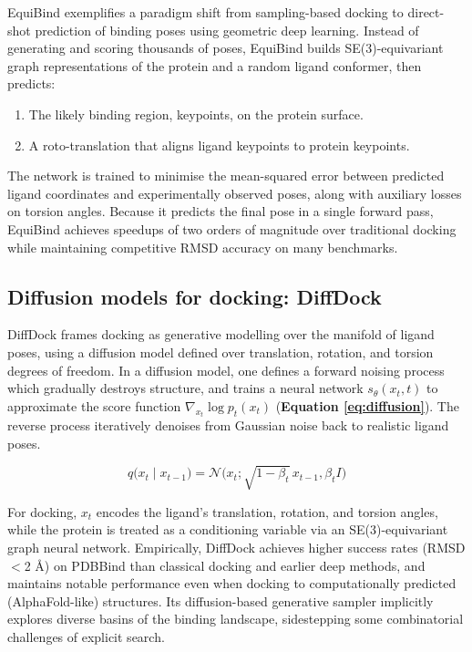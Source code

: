 \documentclass[12pt]{article}
\begin{document}
EquiBind\cite{CH13_stark2022equibind} exemplifies a paradigm shift from sampling-based docking to direct-shot prediction of binding poses using geometric deep learning. Instead of generating and scoring thousands of poses, EquiBind builds SE(3)-equivariant graph representations of the protein and a random ligand conformer, then predicts:
\begin{enumerate}
  \item The likely binding region, keypoints, on the protein surface.
  \item A roto-translation that aligns ligand keypoints to protein keypoints.
\end{enumerate}
The network is trained to minimise the mean-squared error between predicted ligand coordinates and experimentally observed poses, along with auxiliary losses on torsion angles\cite{CH13_stark2022equibind,CH13_equibindnews2023}. Because it predicts the final pose in a single forward pass, EquiBind achieves speedups of two orders of magnitude over traditional docking while maintaining competitive RMSD accuracy on many benchmarks.

\subsection{Diffusion models for docking: DiffDock}

DiffDock\cite{CH13_corso2022diffdock} frames docking as generative modelling over the manifold of ligand poses, using a diffusion model defined over translation, rotation, and torsion degrees of freedom. In a diffusion model, one defines a forward noising process which gradually destroys structure, and trains a neural network $s_{\theta}(x_t, t)$ to approximate the score function $\nabla_{x_t} \log p_t(x_t)$ (\textbf{Equation \ref{eq:diffusion}}).  The reverse process iteratively denoises from Gaussian noise back to realistic ligand poses. 

\begin{equation}
q\big(x_t \mid x_{t-1}\big) = \mathcal{N}\big(x_t; \sqrt{1 - \beta_t}\,x_{t-1}, \beta_t I\big)
\label{eq:diffusion}
\end{equation}


For docking, $x_t$ encodes the ligand’s translation, rotation, and torsion angles, while the protein is treated as a conditioning variable via an SE(3)-equivariant graph neural network\cite{CH13_corso2022diffdock}. Empirically, DiffDock achieves higher success rates (RMSD $<$2 \r{A}) on PDBBind than classical docking and earlier deep methods, and maintains notable performance even when docking to computationally predicted (AlphaFold-like) structures\cite{CH13_corso2022diffdock, CH13_suriana2023enhancing}. Its diffusion-based generative sampler implicitly explores diverse basins of the binding landscape, sidestepping some combinatorial challenges of explicit search.
\end{document}
